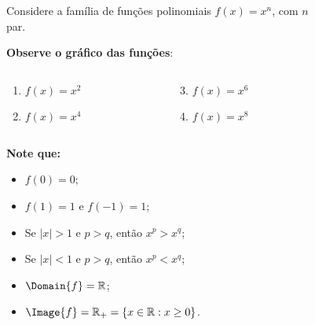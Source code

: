 \begin{frame}
  \begin{columns}[onlytextwidth]
    \begin{column}{0.49\textwidth}
      \vspace*{-0.35cm}
      \begin{example}
        Considere a família de funções polinomiais $f(x)=x^{n}$, com $n$ par.
      \end{example}
      \textbf{Observe o gráfico das funções}:
      \vspace*{-0.5cm}
      \begin{columns}[onlytextwidth]
        \begin{column}{0.5\textwidth}
          \begin{enumerate}
            \item< 1- > $f(x)=x^{2}$
            \item< 2- > $f(x)=x^{4}$
          \end{enumerate}
        \end{column}
        \begin{column}{0.5\textwidth}
          \begin{enumerate}
            \setcounter{enumi}{2}
            \item< 3- > $f(x)=x^{6}$
            \item< 4- > $f(x)=x^{8}$
          \end{enumerate}
        \end{column}
      \end{columns}
      \vspace*{0.35cm}
      \begin{highlight}
        \textbf{Note que:}
        \begin{itemize}
          \item< 1- > $f(0)=0$;
          \item< 1- > $f(1) = 1$ e $f(-1)=1$;
          \item< 4- > Se $|x| > 1$ e $p>q$, então $x^{p} > x^{q}$;
          \item< 4- > Se $|x| < 1$ e $p>q$, então $x^{p} < x^{q}$;
          \item< 4- > $\Domain{f}=\mathbb{R}$;
          \item< 4- > $\Image{f}=\mathbb{R}_{+} = \left\{x\in\mathbb{R}:x\geq 0\right\}$.
        \end{itemize}
      \end{highlight}
    \end{column}
    \begin{column}{0.49\textwidth}
        \begin{figure}
      \end{figure}
    \end{column}
  \end{columns}
\end{frame}

